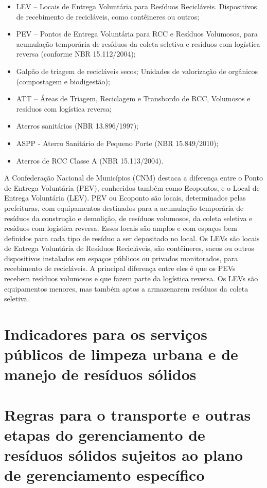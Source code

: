 \begin{itemize}
	\item LEV – Locais de Entrega Voluntária para Resíduos Recicláveis. Dispositivos de recebimento de recicláveis, como contêineres ou outros; 
	\item PEV – Pontos de Entrega Voluntária para RCC e Resíduos Volumosos, para acumulação temporária de resíduos da coleta seletiva e resíduos com logística reversa (conforme NBR 15.112/2004);
	\item Galpão de triagem de recicláveis secos; 
	Unidades de valorização de orgânicos (compostagem e biodigestão);
	\item ATT – Áreas de Triagem, Reciclagem e Transbordo de RCC, Volumosos e resíduos com logística reversa;
	\item Aterros sanitários (NBR 13.896/1997);
	\item ASPP - Aterro Sanitário de Pequeno Porte (NBR 15.849/2010); 
	\item Aterros de RCC Classe A (NBR 15.113/2004).
\end{itemize}

A Confederação Nacional de Municípios (CNM) destaca a diferença entre o Ponto de Entrega Voluntária (PEV), conhecidos também como Ecopontos, e o Local de Entrega Voluntária (LEV). PEV ou Ecoponto são locais, determinados pelas prefeituras, com equipamentos destinados para a acumulação temporária de resíduos da construção e demolição, de resíduos volumosos, da coleta seletiva e resíduos com logística reversa. Esses locais são amplos e com espaços bem definidos para cada tipo de resíduo a ser depositado no local. Os LEVs são locais de Entrega Voluntária de Resíduos Recicláveis, são contêineres, sacos ou outros dispositivos instalados em espaços públicos ou privados monitorados, para recebimento de recicláveis. A principal diferença entre eles é que os PEVs recebem resíduos volumosos e que fazem parte da logística reversa. Os LEVs são equipamentos menores, mas também aptos a armazenarem resíduos da coleta seletiva.

\newpage
\FloatBarrier
\section{Indicadores para os serviços públicos de limpeza urbana e de manejo de resíduos sólidos}
\label{sec:indicadores}

\newpage
\FloatBarrier
\section{Regras para o transporte e outras etapas do gerenciamento de resíduos sólidos sujeitos ao plano de gerenciamento específico}
\label{sec:regras_trans}

